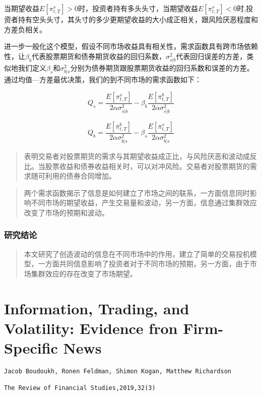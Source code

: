 \documentclass[
]{article}
\begin{document}
当期望收益\(E[\pi_{t,T}^s] >0\)时，投资者持有多头头寸，当期望收益\(E[\pi_{t,T}^s] <0\)时,投资者持有空头头寸，其头寸的多少更期望收益的大小成正相关，跟风险厌恶程度和方差负相关。

进一步一般化这个模型，假设不同市场收益具有相关性，需求函数具有跨市场依赖性，让\(\beta_b\)代表股票期货和债券期货收益的回归系数，\(\sigma^2_{s|b}\)代表回归误差的方差，类似地我们定义\(\beta_s\)和\(\sigma^2_{b|s}\)分别为债券期货跟股票期货收益的回归系数和误差的方差。通过均值---方差最优决策，我们的到不同市场的需求函数如下：

\[Q_s=\frac{E[\pi_{t,T}^s]}{2\alpha \sigma_{s|b}^2}-\beta_b\frac{E[\pi_{t,T}^b]}{2\alpha \sigma_{s|b}^2}\]

\[Q_b=\frac{E[\pi_{t,T}^b]}{2\alpha \sigma_{b|s}^2}-\beta_s\frac{E[\pi_{t,T}^s]}{2\alpha \sigma_{b|s}^2}\]

\begin{quote}
表明交易者对股票期货的需求与其期望收益成正比，与风险厌恶和波动成反比。当股票收益和债券收益相关时，可以对冲风险。交易者对股票期货的需求随可利用的债券合同增加。
\end{quote}

\begin{quote}
两个需求函数揭示了信息是如何建立了市场之间的联系，一方面信息同时影响不同市场的期望收益，产生交易量和波动，另一方面，信息通过集群效应改变了市场的预期和波动。
\end{quote}

\hypertarget{ux7814ux7a76ux7ed3ux8bba-1}{%
\subsubsection{研究结论}\label{ux7814ux7a76ux7ed3ux8bba-1}}

\begin{quote}
本文研究了创造波动的信息在不同市场中的作用，建立了简单的交易投机模型，一方面共同信息影响了投资者对于不同市场的预期，另一方面，由于市场集群效应的存在改变了市场期望。
\end{quote}

\hypertarget{information-trading-and-volatility-evidence-fron-firm-specific-news}{%
\section{Information, Trading, and Volatility: Evidence fron
Firm-Specific
News}\label{information-trading-and-volatility-evidence-fron-firm-specific-news}}

\begin{verbatim}
Jacob Boudoukh, Ronen Feldman, Shimon Kogan, Matthew Richardson

The Review of Financial Studies,2019,32(3)
\end{verbatim}
\end{document}
